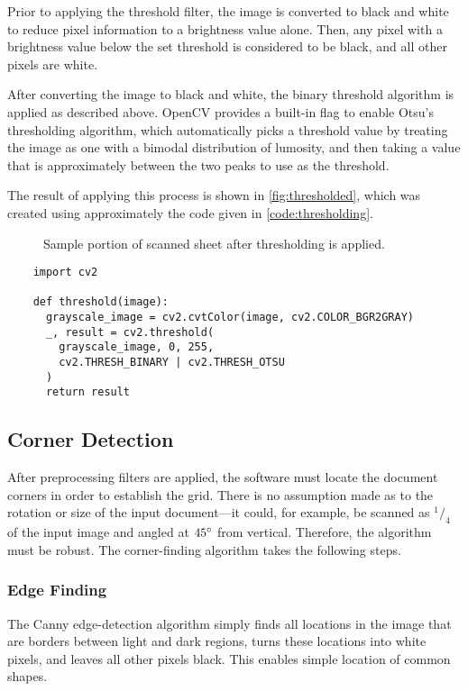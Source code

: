 \documentclass[12pt, letterpaper]{report}
\newcommand*{\itemref}[1]{\hypersetup{linkcolor=usfgreen}\hyperref[{#1}]{\autoref*{#1}}}
\newcommand*{\boxedimage}[1]{\fbox{\texttt{[image: img/\#1]}}}
\newcommand{\fig}[3]{
  \begin{figure}[h]
    \caption{#1}
    \label{#3}
    \centering
    \boxedimage{#2}
  \end{figure}
}
\begin{document}
Prior to applying the threshold filter, the image is converted to black and
white to reduce pixel information to a brightness value alone. Then, any pixel
with a brightness value below the set threshold is considered to be black, and
all other pixels are white.

After converting the image to black and white, the binary threshold algorithm is
applied as described above. OpenCV provides a built-in flag to enable Otsu's
thresholding algorithm, which automatically picks a threshold value by treating the image
as one with a bimodal distribution of lumosity, and then taking a value that is
approximately between the two peaks to use as the threshold.

The result of applying this process is shown in \itemref{fig:thresholded}, which
was created using approximately the code given in \itemref{code:thresholding}.

\fig{Sample portion of scanned sheet after thresholding is applied.}{sample/thresholded.jpg}{fig:thresholded}

\begin{codesample}[h]
  \caption{Black-and-white conversion and thresholding of an input image.}
  \label{code:thresholding}
  \begin{verbatim}
    import cv2

    def threshold(image):
      grayscale_image = cv2.cvtColor(image, cv2.COLOR_BGR2GRAY)
      _, result = cv2.threshold(
        grayscale_image, 0, 255,
        cv2.THRESH_BINARY | cv2.THRESH_OTSU
      )
      return result
  \end{verbatim}
\end{codesample}


\subsection{Corner Detection}
\label{sect:cornerfinding}
After preprocessing filters are applied, the software must locate the document
corners in order to establish the grid. There is no assumption made as to the
rotation or size of the input document---it could, for example, be scanned as
$^1/_4$ of the input image and angled at $45\degree$ from vertical. Therefore,
the algorithm must be robust. The corner-finding algorithm takes the following
steps.

\subsubsection{Edge Finding}
The Canny edge-detection algorithm simply finds all
locations in the image that are borders between light and dark regions, turns
these locations into white pixels, and leaves all other pixels black. This
enables simple location of common shapes.
\end{document}
